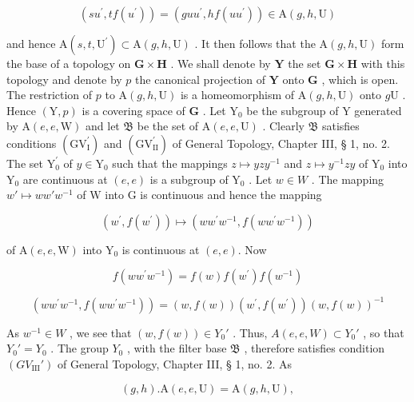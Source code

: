 \[
(s u ^ {\prime}, t f (u ^ {\prime})) = (g u u ^ {\prime}, h f (u u ^ {\prime})) \in \mathrm{A} (g, h, \mathrm{U})
\]

and hence \(\mathrm{A}(s,t,\mathrm{U}^{\prime})\subset \mathrm{A}(g,h,\mathrm{U})\) . It then follows that the \(\mathrm{A}(g,h,\mathrm{U})\) form the base of a topology on \(\mathbf{G}\times \mathbf{H}\) . We shall denote by \(\mathbf{Y}\) the set \(\mathbf{G}\times \mathbf{H}\) with this topology and denote by \(p\) the canonical projection of \(\mathbf{Y}\) onto \(\mathbf{G}\) , which is open. The restriction of \(p\) to \(\mathrm{A}(g,h,\mathrm{U})\) is a homeomorphism of \(\mathrm{A}(g,h,\mathrm{U})\) onto \(g\mathrm{U}\) . Hence \((\mathrm{Y},p)\) is a covering space of \(\mathbf{G}\) . Let \(\mathrm{Y}_0\) be the subgroup of \(\mathrm{Y}\) generated by \(\mathrm{A}(e,e,\mathrm{W})\) and let \(\mathfrak{B}\) be the set of \(\mathrm{A}(e,e,\mathrm{U})\) . Clearly \(\mathfrak{B}\) satisfies conditions \((\mathrm{GV}_{\mathrm{I}}^{\prime})\) and \((\mathrm{GV}_{\mathrm{II}}^{\prime})\) of General Topology, Chapter III, § 1, no. 2. The set \(\mathrm{Y}_0^{\prime}\) of \(y\in \mathrm{Y}_0\) such that the mappings \(z\mapsto yzy^{-1}\) and \(z\mapsto y^{-1}zy\) of \(\mathrm{Y}_0\) into \(\mathrm{Y}_0\) are continuous at \((e,e)\) is a subgroup of \(\mathrm{Y}_0\) . Let \(w\in W\) . The mapping \(w'\mapsto ww'w^{-1}\) of \(\mathrm{W}\) into \(\mathrm{G}\) is continuous and hence the mapping

\[
\left(w ^ {\prime}, f \left(w ^ {\prime}\right)\right) \mapsto \left(w w ^ {\prime} w ^ {- 1}, f \left(w w ^ {\prime} w ^ {- 1}\right)\right)
\]

of \(\mathrm{A}(e,e,\mathrm{W})\) into \(\mathrm{Y}_0\) is continuous at \((e,e)\). Now

\[
f \left(w w ^ {\prime} w ^ {- 1}\right) = f (w) f \left(w ^ {\prime}\right) f \left(w ^ {- 1}\right)
\]

\[
\left(w w ^ {\prime} w ^ {- 1}, f \left(w w ^ {\prime} w ^ {- 1}\right)\right) = (w, f (w)) \left(w ^ {\prime}, f \left(w ^ {\prime}\right)\right) \left(w, f (w)\right) ^ {- 1}
\]

As \(w^{-1} \in W\) , we see that \((w, f(w)) \in Y_0'\) . Thus, \(A(e, e, W) \subset Y_0'\) , so that \(Y_0' = Y_0\) . The group \(Y_0\) , with the filter base \(\mathfrak{B}\) , therefore satisfies condition \((GV_{\mathrm{III}}')\) of General Topology, Chapter III, § 1, no. 2. As

\[
(g, h). \mathrm{A} (e, e, \mathrm{U}) = \mathrm{A} (g, h, \mathrm{U}),
\]

